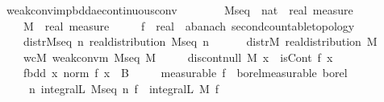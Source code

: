 \documentclass[leqno]{article}
\theoremstyle{definition}
\begin{document}
\begin{isabellebody}
\isamarkupfalse%
\ weak{\isacharunderscore}conv{\isacharunderscore}imp{\isacharunderscore}bdd{\isacharunderscore}ae{\isacharunderscore}continuous{\isacharunderscore}conv{\isacharcolon}\isanewline
\ \ \ \isanewline
\ \ \ \ M{\isacharunderscore}seq\ {\isacharcolon}{\isacharcolon}\ {\isachardoublequoteopen}nat\ {\isasymRightarrow}\ real\ measure{\isachardoublequoteclose}\ \isanewline
\ \ \ \ M\ {\isacharcolon}{\isacharcolon}\ {\isachardoublequoteopen}real\ measure{\isachardoublequoteclose}\ \isanewline
\ \ \ \ f\ {\isacharcolon}{\isacharcolon}\ {\isachardoublequoteopen}real\ {\isasymRightarrow}\ {\isacharprime}a{\isacharcolon}{\isacharcolon}{\isacharbraceleft}banach{\isacharcomma}\ second{\isacharunderscore}countable{\isacharunderscore}topology{\isacharbraceright}{\isachardoublequoteclose}\isanewline
\ \ \ \isanewline
\ \ \ \ distr{\isacharunderscore}M{\isacharunderscore}seq{\isacharcolon}\ {\isachardoublequoteopen}{\isasymAnd}n{\isachardot}\ real{\isacharunderscore}distribution\ {\isacharparenleft}M{\isacharunderscore}seq\ n{\isacharparenright}{\isachardoublequoteclose}\ \ \isanewline
\ \ \ \ distr{\isacharunderscore}M{\isacharcolon}\ {\isachardoublequoteopen}real{\isacharunderscore}distribution\ M{\isachardoublequoteclose}\ \ \isanewline
\ \ \ \ wcM{\isacharcolon}\ {\isachardoublequoteopen}weak{\isacharunderscore}conv{\isacharunderscore}m\ M{\isacharunderscore}seq\ M{\isachardoublequoteclose}\ \isanewline
\ \ \ \ discont{\isacharunderscore}null{\isacharcolon}\ {\isachardoublequoteopen}M\ {\isacharparenleft}{\isacharbraceleft}x{\isachardot}\ {\isasymnot}\ isCont\ f\ x{\isacharbraceright}{\isacharparenright}\ {\isacharequal}\ {}{\isachardoublequoteclose}\ \isanewline
\ \ \ \ f{\isacharunderscore}bdd{\isacharcolon}\ {\isachardoublequoteopen}{\isasymAnd}x{\isachardot}\ norm\ {\isacharparenleft}f\ x{\isacharparenright}\ {\isasymle}\ B{\isachardoublequoteclose}\ \isanewline
\ \ \ \ {\isacharbrackleft}measurable{\isacharbrackright}{\isacharcolon}\ {\isachardoublequoteopen}f\ {\isasymin}\ borel{\isacharunderscore}measurable\ borel{\isachardoublequoteclose}\isanewline
\ \ \ \isanewline
\ \ \ \ {\isachardoublequoteopen}{\isacharparenleft}{\isasymlambda}\ n{\isachardot}\ integral\isactrlsup L\ {\isacharparenleft}M{\isacharunderscore}seq\ n{\isacharparenright}\ f{\isacharparenright}\ {\isacharminus}{\isacharminus}{\isacharminus}{\isacharminus}{\isachargreater}\ integral\isactrlsup L\ M\ f{\isachardoublequoteclose}
\end{isabellebody}
\end{document}
